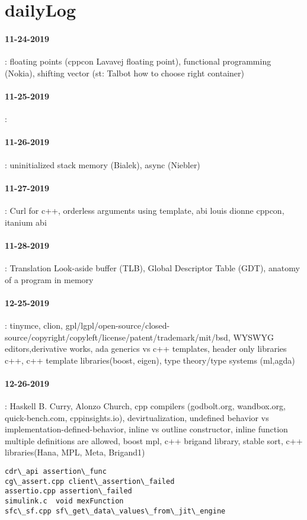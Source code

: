\section{dailyLog}
\paragraph{11-24-2019}: floating points (cppcon Lavavej floating point), functional programming (Nokia), shifting vector (st: Talbot how to choose right container)
\paragraph{11-25-2019}:
\paragraph{11-26-2019}: uninitialized stack memory (Bialek), async (Niebler) 
\paragraph{11-27-2019}: Curl for c++, orderless arguments using template, abi louis dionne cppcon, itanium abi
\paragraph{11-28-2019}: Translation Look-aside buffer (TLB), Global Descriptor Table (GDT), anatomy of a program in memory 
\paragraph{12-25-2019}: tinymce, clion, gpl/lgpl/open-source/closed-source/copyright/copyleft/license/patent/trademark/mit/bsd, WYSWYG editors,derivative works, ada generics vs c++ templates, header only libraries c++, c++ template libraries(boost, eigen), type theory/type systems
(ml,agda)
\paragraph{12-26-2019}: Haskell B. Curry, Alonzo Church, cpp compilers (godbolt.org, wandbox.org, quick-bench.com, cppinsights.io), devirtualization,
undefined behavior vs implementation-defined-behavior, inline vs outline constructor, inline function multiple definitions are allowed, 
boost mpl, c++ brigand library, stable sort, c++ libraries(Hana, MPL, Meta, Brigand1)
\begin{verbatim}
cdr\_api assertion\_func
cg\_assert.cpp client\_assertion\_failed
assertio.cpp assertion\_failed
simulink.c  void mexFunction
sfc\_sf.cpp sf\_get\_data\_values\_from\_jit\_engine
\end{verbatim}
